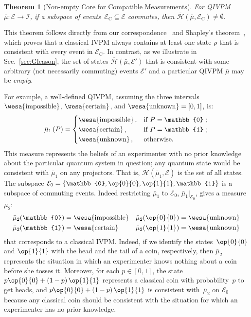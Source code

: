 \documentclass[english,reprint, aps, prl,superscriptaddress, showpacs,
showkeys, longbibliography, amsmath, amssymb, floatfix]{revtex4-1}
\theoremstyle{plain}
\newtheorem{thm}{Theorem}
\theoremstyle{definition}
\newcommand{\Hilb}{\mathcal{H}}
\newcommand{\events}{\ensuremath{\mathcal{E}}}
\newcommand{\imposs}{{\text{\wesa{impossible}}}}
\newcommand{\necess}{{\text{\wesa{certain}}}}
\newcommand{\unknown}{{\text{\wesa{unknown}}}}
\newcommand{\proj}[1]{\op{#1}{#1}}
\newcommand{\coreBorn}{\ensuremath{\overline{\Hilb}}}
\begin{document}
\begin{thm}[Non-empty Core for Compatible Measurements] \label{thm:Shapley}
  For QIVPM~$\bar{\mu}:\events\rightarrow\mathscr{I}$, if a subspace
  of events~$\events_{\mathrm{C}}\subseteq\events$ commutes, then
  $\coreBorn\left(\bar{\mu},\events_{\mathrm{C}}\right)\ne\emptyset$.
\end{thm}

This theorem follows directly from our
correspondence~\cite{HOSTunpublished} and Shapley's
theorem~\cite{Shapley1971,GilboaSchmeidler1994,NgMoYeh1997,Grabisch2016},
which proves that a classical IVPM always contains at least one state $\rho$
that is consistent with every event in $\events_{\mathrm{C}}$. In contrast, as we
illustrate in Sec.~\ref{sec:Gleason}, the set of states
$\coreBorn\left(\bar{\mu},\events'\right)$ that is consistent with
some arbitrary (not necessarily commuting) events $\events'$ and a
particular QIVPM $\bar{\mu}$ may be \emph{empty}.

For example, a well-defined  
QIVPM, assuming the three intervals $\imposs$, $\necess$, and
$\unknown=\left[0,1\right]$, is:
\begin{equation}
\bar{\mu}_{1}\left(P\right)=\begin{cases}
\imposs\,, & \text{if }P=\mathbb{0}\text{ ;}\\
\necess\,, & \text{if }P=\mathbb{1}\text{ ;}\\
\unknown\,, & \text{otherwise.}
\end{cases}\label{eq:no-information-IVPM}
\end{equation}
This measure represents the beliefs of an experimenter with no prior
knowledge about the particular quantum system in question; any quantum
state would be consistent with $\bar{\mu}_{1}$ on any projectors. That
is, $\coreBorn\left(\bar{\mu}_{1},\events\right)$ is the set of all
states. The subspace
$\events_{0}=\left\{ \mathbb{0},\proj{0},\proj{1},\mathbb{1}\right\} $
is a subspace of commuting events. Indeed restricting $\bar{\mu}_{1}$
to $\events_{0}$, $\bar{\mu}_{1}|_{\events_{0}}$, gives a measure
$\bar{\mu}_{2}$:
\begin{equation}
\begin{aligned}\bar{\mu}_{2}(\mathbb{0}) & =\imposs & \bar{\mu}_{2}(\proj{0}) & =\unknown\\
\bar{\mu}_{2}(\mathbb{1}) & =\necess & \bar{\mu}_{2}(\proj{1}) & =\unknown
\end{aligned}
\label{eq:classical-no-information-IVPM}
\end{equation}
that corresponds to a classical IVPM. Indeed, if we identify the
states~$\proj{0}$ and $\proj{1}$ with the head and the tail of a coin,
respectively, then $\bar{\mu}_{2}$ represents the situation in which
an experimenter knows nothing about a coin before she tosses
it. Moreover, for each $p\in\left[0,1\right]$, the
state~$p\proj{0}+\left(1-p\right)\proj{1}$ represents a classical coin
with probability~$p$ to get heads, and
$p\proj{0}+\left(1-p\right)\proj{1}$ is consistent
with~$\bar{\mu}_{2}$ on $\events_{0}$ because any classical coin
should be consistent with the situation for which an experimenter has
no prior knowledge.
\end{document}
